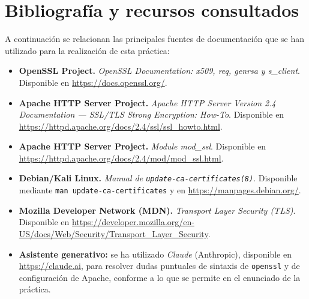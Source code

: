 \chapter{Bibliografía y recursos consultados}
A continuación se relacionan las principales fuentes de documentación que se han utilizado para la realización de esta práctica:

\begin{itemize}
    \item \textbf{OpenSSL Project.} \emph{OpenSSL Documentation: x509, req, genrsa y s\_client}. Disponible en \url{https://docs.openssl.org/}.
    \item \textbf{Apache HTTP Server Project.} \emph{Apache HTTP Server Version 2.4 Documentation — SSL/TLS Strong Encryption: How-To}. Disponible en \url{https://httpd.apache.org/docs/2.4/ssl/ssl_howto.html}.
    \item \textbf{Apache HTTP Server Project.} \emph{Module mod\_ssl}. Disponible en \url{https://httpd.apache.org/docs/2.4/mod/mod_ssl.html}.
    \item \textbf{Debian/Kali Linux.} \emph{Manual de \texttt{update-ca-certificates(8)}}. Disponible mediante \texttt{man update-ca-certificates} y en \url{https://manpages.debian.org/}.
    \item \textbf{Mozilla Developer Network (MDN).} \emph{Transport Layer Security (TLS)}. Disponible en \url{https://developer.mozilla.org/en-US/docs/Web/Security/Transport_Layer_Security}.
    \item \textbf{Asistente generativo:} se ha utilizado \emph{Claude} (Anthropic), disponible en \url{https://claude.ai}, para resolver dudas puntuales de sintaxis de \texttt{openssl} y de configuración de Apache, conforme a lo que se permite en el enunciado de la práctica.
\end{itemize}

